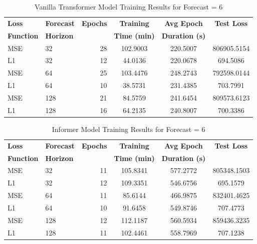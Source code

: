 \documentclass{article}
\begin{document}
\begin{table}
    \centering
    \footnotesize
    \caption{Vanilla Transformer Model Training Results for Forecast = 6}
    \begin{tabular}{l|l|r|S|S|S}
        \toprule
        \textbf{Loss} & \textbf{Forecast} & \textbf{Epochs} & \textbf{Training} & \textbf{Avg Epoch} & \textbf{Test Loss} \\
        \textbf{Function} & \textbf{Horizon} & & \textbf{Time (min)} & \textbf{Duration (s)} & \\
        \midrule
        MSE & 32 & 28 & 102.9003 & 220.5007 & 806905.5154 \\
        L1 & 32 & 12 & 44.0136 & 220.0678 & 694.5086 \\
        \midrule
        MSE & 64 & 25 & 103.4476 & 248.2743 & 792598.0144 \\
        L1 & 64 & 10 & 38.5731 & 231.4385 & 703.7991 \\
        \midrule
        MSE & 128 & 21 & 84.5759 & 241.6454 & 809573.6123 \\
        L1 & 128 & 16 & 64.2135 & 240.8007 & 700.3386 \\
      \bottomrule
    \end{tabular}
    \label{tab:vanillatransformer_training_f6}
    \end{table}

\begin{table}
    \centering
    \caption{Informer Model Training Results for Forecast = 6}
    \begin{tabular}{l|l|r|S|S|S}
        \toprule
        \textbf{Loss} & \textbf{Forecast} & \textbf{Epochs} & \textbf{Training} & \textbf{Avg Epoch} & \textbf{Test Loss} \\
        \textbf{Function} & \textbf{Horizon} & & \textbf{Time (min)} & \textbf{Duration (s)} & \\
        \midrule
        MSE & 32 & 11 & 105.8341 & 577.2772 & 805348.1503 \\
        L1 & 32 & 12 & 109.3351 & 546.6756 & 695.1579 \\
        \midrule
        MSE & 64 & 11 & 85.6144 & 466.9875 & 832401.4625 \\
        L1 & 64 & 10 & 91.6458 & 549.8746 & 707.4773 \\
        \midrule
        MSE & 128 & 12 & 112.1187 & 560.5934 & 859436.3235 \\
        L1 & 128 & 11 & 102.4461 & 558.7969 & 707.1238 \\
      \bottomrule
    \end{tabular}
    \label{tab:informer_training_f6}
    \end{table}
\end{document}
